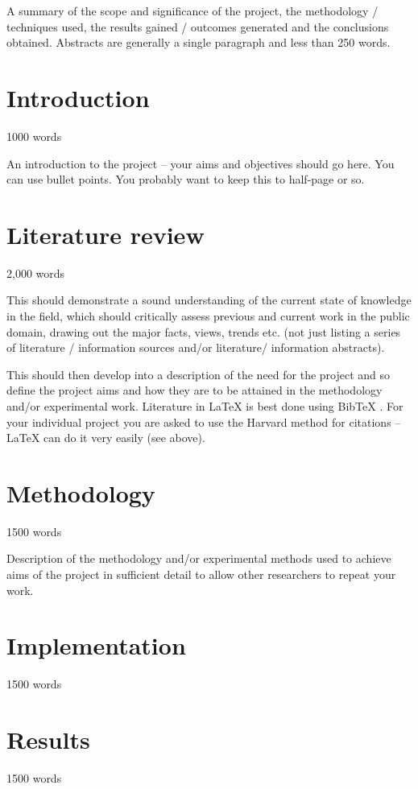 \documentclass[12pt, a4paper]{article}
\begin{document}
A summary of the scope and significance of the project, the methodology / techniques used, the results gained / outcomes generated and the conclusions obtained. Abstracts are generally a single paragraph and less than 250 words.





\section{Introduction}
1000 words

An introduction to the project -- your aims and objectives should go here. You can use bullet points. You probably want to keep this to half-page or so.


\section{Literature review}
2,000 words 

This should demonstrate a sound understanding of the current state of knowledge in the field, which should critically assess previous and current work in the public domain, drawing out the major facts, views, trends etc. (not just listing a series of literature / information sources and/or literature/ information abstracts). 

This should then develop into a description of the need for the project and so define the
project aims and how they are to be attained in the methodology and/or experimental work. Literature in \LaTeX{} \cite{ardell05} is best done using BibTeX \cite{ashbyjones, hk}. For your individual project you are asked to use the Harvard method for citations -- \LaTeX{} can do it very easily (see above).




\section{Methodology}
1500 words

Description of the methodology and/or experimental methods used to achieve aims of the project in sufficient detail to allow other researchers to repeat your work.



\section{Implementation}
1500 words


\section{Results}
1500 words
\end{document}
